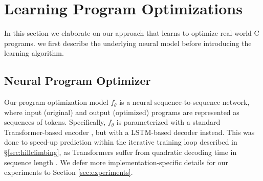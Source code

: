 \documentclass{article}
\begin{document}
\section{Learning Program Optimizations}
\label{sec:learning}


In this section we elaborate on our approach that learns to optimize real-world C programs. 
we first describe the underlying neural model before introducing the learning algorithm.


\subsection{Neural Program Optimizer}


Our program optimization model $f_{\theta}$ is a neural sequence-to-sequence network, where input (original) and output (optimized) programs are represented as sequences of tokens.
Specifically, $f_{\theta}$ is parameterized with a standard Transformer-based encoder \citep{vaswani2017attention}, but with a LSTM-based decoder \citep{hochreiter1997long,chen-etal-2018-best} instead.
This was done to speed-up prediction within the iterative training loop described in \S\ref{sec:hillclimbing}, as Transformers suffer from quadratic decoding time in sequence length \citep{zhang-etal-2018-accelerating}. We defer more implementation-specific details for our experiments to Section \ref{sec:experiments}. 
\end{document}
